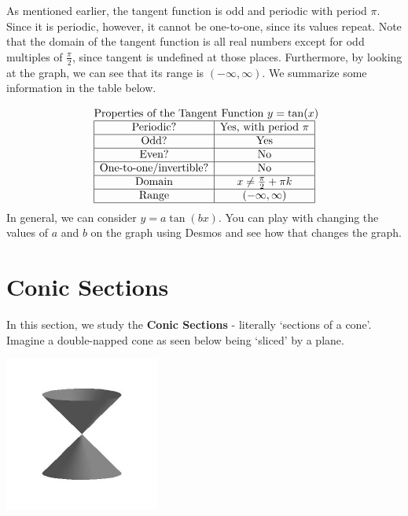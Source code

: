 \documentclass[nooutcomes]{ximera}
\begin{document}
As mentioned earlier, the tangent function is odd and periodic with period $\pi$. Since it is periodic, however, it cannot be one-to-one, since its values repeat. Note that the domain of the tangent function is all real numbers except for odd multiples of $\frac{\pi}{2}$, since tangent is undefined at those places. Furthermore, by looking at the graph, we can see that its range is $(-\infty, \infty)$. We summarize some information in the table below. 

\[
\begin{array}{ c }
 \text{ Properties of the Tangent Function } y=\tan(x) \\
\begin{array}{|c|c|}
 \hline
\text{Periodic?} & \text{Yes, with period }\pi \\ \hline
\text{Odd?} & \text{Yes} \\ \hline
\text{Even?} & \text{No} \\ \hline
\text{One-to-one/invertible?} & \text{No} \\ \hline
\text{Domain} & x \ne \frac{\pi}{2} + \pi k\\ \hline
\text{Range} & (-\infty, \infty)\\ \hline
\end{array}
\end{array}
\]
In general, we can consider $y=a\tan(bx)$.  You can play with changing the values of $a$ and $b$ on the graph using Desmos and see how that changes the graph.  

\begin{center}  
\end{center}



\section{Conic Sections}
In this section, we study the  \textbf{Conic Sections} - literally `sections of a  cone'.  Imagine a double-napped cone as seen below being `sliced' by a plane. 

\centerline{\includegraphics[width=2in]{./ConicsGraphics/cone.jpg}}
\end{document}
